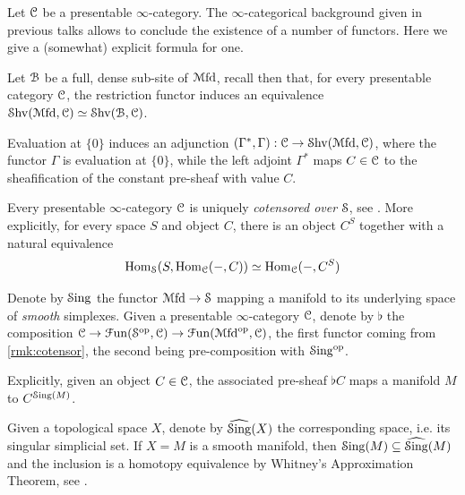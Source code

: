 \documentclass[10pt]{amsart}
\begin{document}
Let $\mathcal{C}$ be a presentable $\infty$-category. The $\infty$-categorical background given in previous talks allows to conclude the existence of a number of functors. Here we give a (somewhat) explicit formula for one. 
\begin{remark}
  Let $\mathcal{B}$ be a full, dense sub-site of $\mathcal{M}\mathrm{fd}$, recall then that, for every presentable category $\mathcal{C}$, the restriction functor induces an equivalence $\mathcal{S}\mathrm{hv}(\mathcal{M}\mathrm{fd},\mathcal{C})\simeq\mathcal{S}\mathrm{hv}(\mathcal{B},\mathcal{C})$. 
\end{remark}
Evaluation at $\{0\}$ induces an adjunction $(\Gamma^*,\Gamma):\mathcal{C}\to\mathcal{S}\mathrm{hv}(\mathcal{M}\mathrm{fd},\mathcal{C})$, where the functor $\Gamma$ is evaluation at $\{0\}$, while the left adjoint $\Gamma^*$ maps $C\in\mathcal{C}$ to the sheafification of the constant pre-sheaf with value $C$. 
\begin{remark}\label{rmk:cotensor}
Every presentable $\infty$-category $\mathcal{C}$ is uniquely \emph{cotensored over} $\mathcal{S}$, see \cite[Remark 5.5.2.6]{lurie2009htt}. More explicitly, for every space $S$ and object $C$, there is an object $C^S$ together with a natural equivalence \[\mathrm{Hom}_{\mathcal{S}}(S,\mathrm{Hom}_{\mathcal{C}}(-,C))\simeq\mathrm{Hom}_{\mathcal{C}}(-,C^S)\]
\end{remark}
\begin{definition}\label{def:flat}
  Denote by $\mathcal{S}\mathrm{ing}$ the functor $\mathcal{M}\mathrm{fd}\to\mathcal{S}$ mapping a manifold to its underlying space of \emph{smooth} simplexes. Given a presentable $\infty$-category $\mathcal{C}$, denote by $\flat$ the composition $\mathcal{C}\to\mathcal{F}\mathrm{un}(\mathcal{S}^{\mathrm{op}},\mathcal{C})\to\mathcal{F}\mathrm{un}(\mathcal{M}\mathrm{fd}^{\mathrm{op}},\mathcal{C})$, the first functor coming from \cref{rmk:cotensor}, the second being pre-composition with $\mathcal{S}\mathrm{ing}^{\mathrm{op}}$.
\end{definition}
Explicitly, given an object $C\in\mathcal{C}$, the associated pre-sheaf $\flat C$ maps a manifold $M$ to $C^{\mathcal{S}\mathrm{ing}(M)}$.
\begin{remark}
  Given a topological space $X$, denote by $\widehat{\mathcal{S}\mathrm{ing}}(X)$ the corresponding space, i.e. its singular simplicial set. If $X=M$ is a smooth manifold, then $\mathcal{S}\mathrm{ing}(M)\subseteq\widehat{\mathcal{S}\mathrm{ing}}(M)$ and the inclusion is a homotopy equivalence by Whitney's Approximation Theorem, see \cite[Theorem 1.6]{zuoqin2021whitney}. 
\end{remark}
\end{document}
